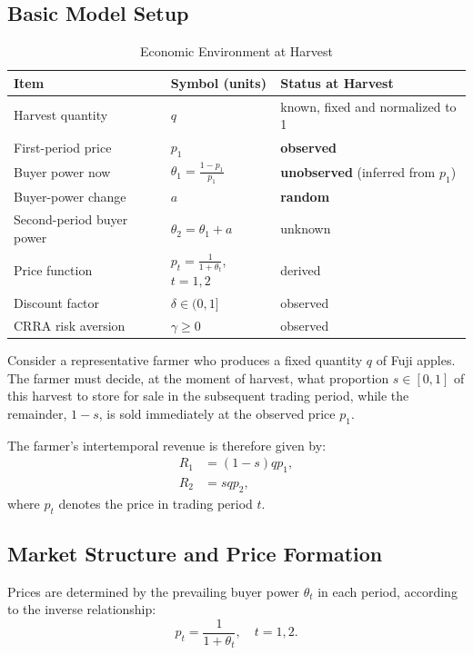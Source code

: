 \documentclass[12pt]{article}
\begin{document}
\subsection{Basic Model Setup}


\begin{table}[H]
\centering
\caption{Economic Environment at Harvest}
\begin{tabular}{lll}
\toprule
\textbf{Item} & \textbf{Symbol (units)} & \textbf{Status at Harvest} \\
\midrule
Harvest quantity & $q$ & known, fixed and normalized to 1 \\
First-period price & $p_1$ & \textbf{observed} \\
Buyer power now & $\theta_1 = \frac{1 - p_1}{p_1}$ & \textbf{unobserved} (inferred from $p_1$) \\
Buyer-power change & $a$ & \textbf{random} \\
Second-period buyer power & $\theta_2 = \theta_1 + a$ & unknown \\
Price function & $p_t = \frac{1}{1 + \theta_t}$, $t=1,2$ & derived \\
Discount factor & $\delta \in (0,1]$ & observed \\
CRRA risk aversion & $\gamma \geq 0$ & observed \\
\bottomrule
\end{tabular}
\end{table}



Consider a representative farmer who produces a fixed quantity \( q \) of Fuji apples. The farmer must decide, at the moment of harvest, what proportion \( s \in [0,1] \) of this harvest to store for sale in the subsequent trading period, while the remainder, \(1 - s\), is sold immediately at the observed price \(p_1\).

The farmer's intertemporal revenue is therefore given by:
\begin{align}
    R_1 &= (1 - s) q p_1, \\
    R_2 &= s q p_2,
\end{align}
where \( p_t \) denotes the price in trading period \( t \).

\subsection{Market Structure and Price Formation}

Prices are determined by the prevailing buyer power \( \theta_t \) in each period, according to the inverse relationship:
\begin{equation}
    p_t = \frac{1}{1 + \theta_t}, \quad t = 1, 2.
\end{equation}
\end{document}
